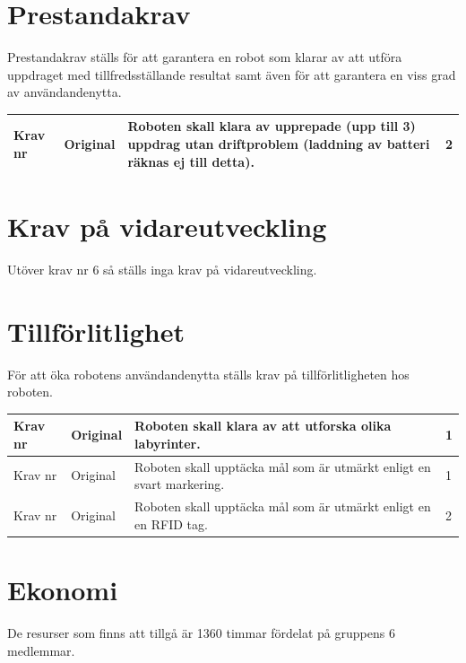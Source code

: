\documentclass[11pt]{article}
\newcounter{kravc}
\newcommand{\kravcc}{
	\thekravc
	\stepcounter{kravc}
}
\begin{document}
\begin{flushleft}
\section{Prestandakrav}
Prestandakrav ställs för att garantera en robot som klarar av att utföra uppdraget med tillfredsställande resultat samt även för att garantera en viss grad av användandenytta.

\begin{center}
\begin{longtable}{|l|l|p{.70\linewidth}|l|} \hline

Krav nr\kravcc &
Original &
Roboten skall klara av upprepade (upp till 3) uppdrag utan driftproblem (laddning av batteri räknas ej till detta). &
2 \\ \hline

\end{longtable}
\end{center}

\section{Krav på vidareutveckling}
Utöver krav nr 6 så ställs inga krav på vidareutveckling.

\section{Tillförlitlighet}
För att öka robotens användandenytta ställs krav på tillförlitligheten hos roboten.

\begin{center}
\begin{longtable}{|l|l|p{.70\linewidth}|l|} \hline

Krav nr\kravcc &
Original &
Roboten skall klara av att utforska olika labyrinter. &
1 \\ \hline

Krav nr\kravcc &
Original &
Roboten skall upptäcka mål som är utmärkt enligt en svart markering. &
1 \\ \hline

Krav nr\kravcc &
Original &
Roboten skall upptäcka mål som är utmärkt enligt en en RFID tag.&
2 \\ \hline

\end{longtable}
\end{center}

\section{Ekonomi}
De resurser som finns att tillgå är 1360 timmar fördelat på gruppens 6 medlemmar. 


\end{flushleft}
\end{document}
